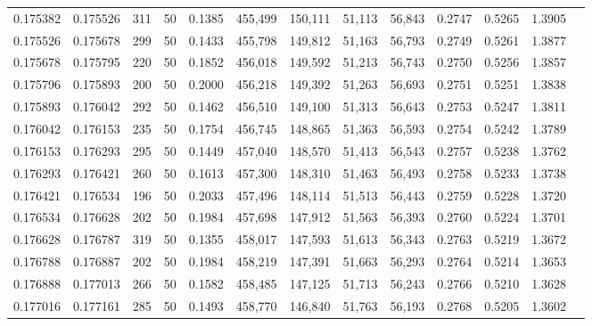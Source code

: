 \begin{tabular}{rrrrrrrrrrrrr}
0.175382 & 0.175526 &   311 &  50 &                                     0.1385 & 455,499 & 150,111 &  51,113 &  56,843 & 0.2747 & 0.5265 & 1.3905 \\
0.175526 & 0.175678 &   299 &  50 &                                     0.1433 & 455,798 & 149,812 &  51,163 &  56,793 & 0.2749 & 0.5261 & 1.3877 \\
0.175678 & 0.175795 &   220 &  50 &                                     0.1852 & 456,018 & 149,592 &  51,213 &  56,743 & 0.2750 & 0.5256 & 1.3857 \\
0.175796 & 0.175893 &   200 &  50 &                                     0.2000 & 456,218 & 149,392 &  51,263 &  56,693 & 0.2751 & 0.5251 & 1.3838 \\
0.175893 & 0.176042 &   292 &  50 &                                     0.1462 & 456,510 & 149,100 &  51,313 &  56,643 & 0.2753 & 0.5247 & 1.3811 \\
0.176042 & 0.176153 &   235 &  50 &                                     0.1754 & 456,745 & 148,865 &  51,363 &  56,593 & 0.2754 & 0.5242 & 1.3789 \\
0.176153 & 0.176293 &   295 &  50 &                                     0.1449 & 457,040 & 148,570 &  51,413 &  56,543 & 0.2757 & 0.5238 & 1.3762 \\
0.176293 & 0.176421 &   260 &  50 &                                     0.1613 & 457,300 & 148,310 &  51,463 &  56,493 & 0.2758 & 0.5233 & 1.3738 \\
0.176421 & 0.176534 &   196 &  50 &                                     0.2033 & 457,496 & 148,114 &  51,513 &  56,443 & 0.2759 & 0.5228 & 1.3720 \\
0.176534 & 0.176628 &   202 &  50 &                                     0.1984 & 457,698 & 147,912 &  51,563 &  56,393 & 0.2760 & 0.5224 & 1.3701 \\
0.176628 & 0.176787 &   319 &  50 &                                     0.1355 & 458,017 & 147,593 &  51,613 &  56,343 & 0.2763 & 0.5219 & 1.3672 \\
0.176788 & 0.176887 &   202 &  50 &                                     0.1984 & 458,219 & 147,391 &  51,663 &  56,293 & 0.2764 & 0.5214 & 1.3653 \\
0.176888 & 0.177013 &   266 &  50 &                                     0.1582 & 458,485 & 147,125 &  51,713 &  56,243 & 0.2766 & 0.5210 & 1.3628 \\
0.177016 & 0.177161 &   285 &  50 &                                     0.1493 & 458,770 & 146,840 &  51,763 &  56,193 & 0.2768 & 0.5205 & 1.3602 \\

\end{tabular}
